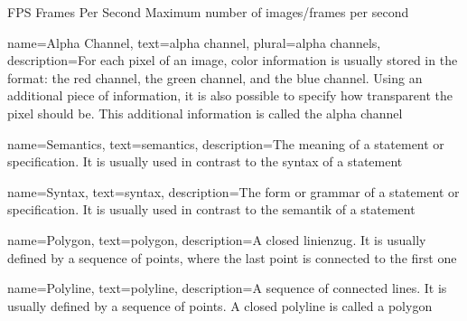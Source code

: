 	{FPS}            %
	{Frames Per Second}  %
	{Maximum number of images/frames per second} %

{
	name={Alpha Channel},
	text={alpha channel},
	plural={alpha channels},
	description={For each pixel of an image, color information is usually stored in the  format: the red channel, the green channel, and the blue channel. Using an additional piece of information, it is also possible to specify how transparent the pixel should be. This additional information is called the alpha channel}
}


{
	name={Semantics},
	text={semantics},
	description={The meaning of a statement or specification. It is usually used in contrast to the \Gls{syntax} of a statement}
}

{
	name={Syntax},
	text={syntax},
	description={The form or grammar of a statement or specification. It is usually used in contrast to the \Gls{semantik} of a statement}
}

{
	name={Polygon},
	text={polygon},
	description={A closed \gls{linienzug}. It is usually defined by a sequence of points, where the last point is connected to the first one}
}

{
	name={Polyline},
	text={polyline},
	description={A sequence of connected lines. It is usually defined by a sequence of points. A closed polyline is called a \gls{polygon}}
}

